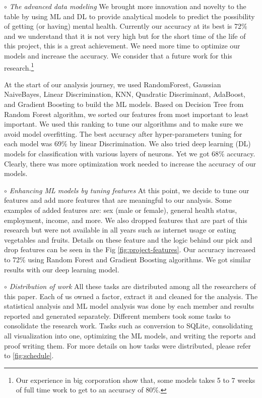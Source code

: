 \documentclass[letterpaper, 10 pt, conference]{ieeeconf}  %
\begin{document}
\par\noindent\textit{$\circ$ The advanced data modeling}\newline
We brought more innovation and novelty to the table by using ML and DL to provide analytical models to predict the possibility of 
getting (or having) mental health. Currently our accuracy at its best is 72\% and we understand that it is not very high but 
for the short time of the life of this project, this is a great achievement.
We need more time to optimize our models and increase the accuracy. We consider that a future work for this 
research.\footnote{Our experience in big corporation show that, some models takes 5 to 7 weeks of full time work to get to an accuracy of 80\%.}

At the start of our analysis journey, 
we used RandomForest, Gaussian NaiveBayes, Linear Discrimination, KNN, Quadratic Discriminant, AdaBoost, and Gradient Boosting to build 
the ML models. Based on Decision Tree from Random Forest algorithm, we sorted our features from most important to least important.
We used this ranking to tune our algorithms and to make sure we avoid model overfitting. 
The best accuracy after hyper-parameters tuning for each model was 69\% by linear Discrimination. 
We also tried deep learning (DL) models for classification with various layers of neurons. Yet we got 68\% accuracy. 
Clearly, there was more optimization work needed to increase the accuracy of our models.  

\par\noindent\textit{$\circ$ Enhancing ML models by tuning features}\newline
At this point, we decide to tune our features and add more features that are meaningful to our analysis. 
Some examples of added features are: sex (male or female), general health status,
employment, income, and more. We also dropped features that are part of this research but were not 
available in all years such as internet usage or eating vegetables and fruits. 
Details on these feature and the logic behind our pick and drop features can be seen in the Fig \ref{fig:project-features}. 
Our accuracy increased to 72\% using Random Forest and Gradient Boosting algorithms. We got similar results with 
our deep learning model.

\par\noindent\textit{$\circ$ Distribution of work}\newline
All these tasks are distributed among all the researchers of this paper. Each of us owned a factor, extract it and cleaned for the
analysis. The statistical analysis and ML model analysis was done by each member and results reported and generated separately. 
Different members took some tasks to consolidate the research work. Tasks such as conversion to SQLite, consolidating all visualization 
into one, optimizing the ML models, and writing the reports and proof writing them. For more details on how tasks were distributed, please 
refer to \ref{fig:schedule}.
\end{document}
